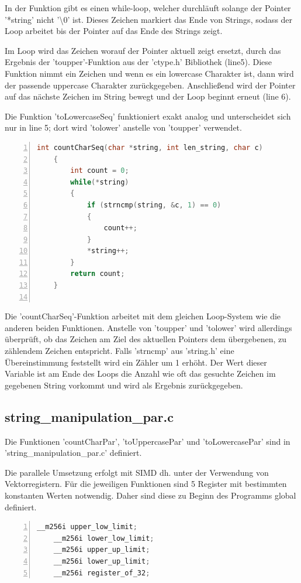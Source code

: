 \documentclass[plainarticle,zihtitle,german,final,hyperref,utf8]{zihpub}
\begin{document}
In der Funktion gibt es einen while-loop, welcher durchläuft solange der Pointer 
 '{*}string' nicht '\textbackslash0' ist. Dieses Zeichen markiert das Ende von Strings, sodass der Loop arbeitet bis der Pointer auf das Ende des Strings zeigt.

Im Loop wird das Zeichen worauf der Pointer aktuell zeigt ersetzt, durch das Ergebnis der 'toupper'-Funktion aus der 'ctype.h' Bibliothek (line5). Diese Funktion nimmt ein Zeichen und wenn es ein lowercase Charakter ist, dann wird der passende uppercase Charakter zurückgegeben. Anschließend wird der Pointer auf das nächste Zeichen im String bewegt und der Loop beginnt erneut (line 6).

Die Funktion 'toLowercaseSeq' funktioniert exakt analog und unterscheidet sich nur in line 5; dort wird 'tolower' anstelle von 'toupper' verwendet.

\begin{lstlisting}[language=c, numbers=left]
	int countCharSeq(char *string, int len_string, char c)
	{
		int count = 0;
		while(*string)
		{
			if (strncmp(string, &c, 1) == 0)
			{
				count++;
			}
			*string++;
		}
		return count;
	}
	
\end{lstlisting}

Die 'countCharSeq'-Funktion arbeitet mit dem gleichen Loop-System wie die anderen beiden Funktionen. Anstelle von 'toupper' und 'tolower' wird allerdings überprüft, ob das Zeichen am Ziel des aktuellen Pointers dem übergebenen, zu zählendem Zeichen entspricht. Falls 'strncmp' aus 'string.h' eine Übereinstimmung feststellt wird ein Zähler um 1 erhöht. Der Wert dieser Variable ist am Ende des Loops die Anzahl wie oft das gesuchte Zeichen im gegebenen String vorkommt und wird als Ergebnis zurückgegeben.


\subsection{string\_manipulation\_par.c}\label{subsec:par}
Die Funktionen 'countCharPar', 'toUppercasePar' und 'toLowercasePar' sind in 'string\_manipulation\_par.c' definiert.

Die parallele Umsetzung erfolgt mit SIMD dh. unter der Verwendung von Vektorregistern. Für die jeweiligen Funktionen sind 5 Register mit bestimmten konstanten Werten notwendig. Daher sind diese zu Beginn des Programms global definiert.
\begin{lstlisting}[language=c, numbers=left]
	__m256i upper_low_limit;
	__m256i lower_low_limit;
	__m256i upper_up_limit;
	__m256i lower_up_limit;
	__m256i register_of_32;
\end{lstlisting}
\end{document}
